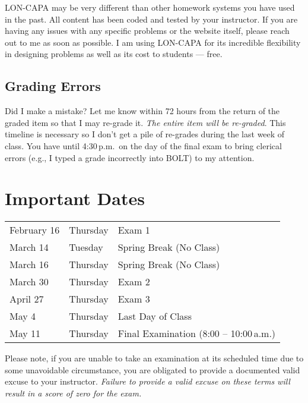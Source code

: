 \documentclass[11pt,letterpaper]{article}
\begin{document}
LON-CAPA may be very different than other homework systems you have used in the
past. All content has been coded and tested by your instructor. If you are
having any issues with any specific problems or the website itself, please reach
out to me as soon as possible. I am using LON-CAPA for its incredible
flexibility in designing problems as well as its cost to students --- free.

\subsection{Grading Errors}
Did I make a mistake? Let me know within 72 hours from the return of the graded
item so that I may re-grade it. \emph{The entire item will be re-graded}. This
timeline is necessary so I don't get a pile of re-grades during the last week of
class. You have until 4:30\,p.m.\ on the day of the final exam to bring clerical
errors (e.g., I typed a grade incorrectly into BOLT) to my attention.

\section{Important Dates}\label{importantdates}
\begin{center}
	\begin{tabular} {l l l}
		February 16  & Thursday   & Exam 1 \\
		March 14     & Tuesday    & Spring Break (No Class) \\
		March 16     & Thursday   & Spring Break (No Class) \\
		March 30     & Thursday   & Exam 2 \\
		April 27     & Thursday   & Exam 3 \\
		May 4        & Thursday   & Last Day of Class \\
		May 11       & Thursday   & Final Examination (8:00 --
		10:00\,a.m.)
	\end{tabular}
\end{center}

Please note, if you are unable to take an examination at
its scheduled time due to some unavoidable circumstance, you are obligated to
provide a documented valid excuse to your instructor. \emph{Failure to provide a
valid excuse on these terms will result in a score of zero for the 
exam.}
\end{document}
